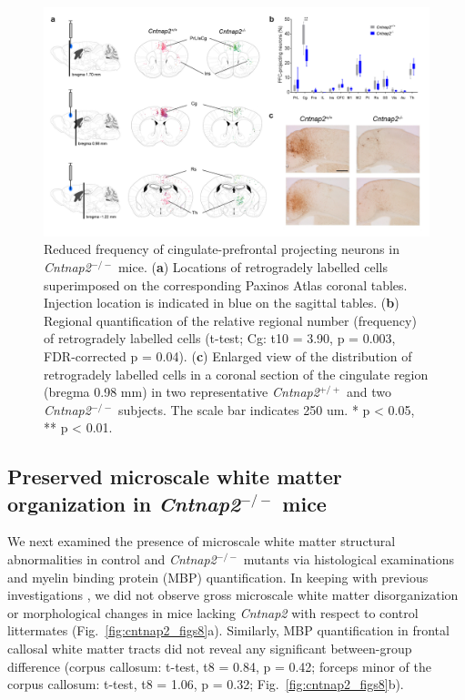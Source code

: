 \begin{figure}[th] 
    \centering
    \includegraphics[scale=0.4]{figures/cntnap2_figure_06.png}
    \decoRule
    \caption[Reduced frequency of cingulate-prefrontal projecting neurons in
    \textit{Cntnap2}$^{-/-}$ mice.]{Reduced frequency of cingulate-prefrontal projecting
    neurons in \textit{Cntnap2}$^{-/-}$ mice. (\textbf{a}) Locations of retrogradely labelled
    cells superimposed on the corresponding Paxinos Atlas coronal tables.
    Injection location is indicated in blue on the sagittal tables. (\textbf{b})
    Regional quantification of the relative regional number (frequency) of
    retrogradely labelled cells (t-test; Cg: t10 = 3.90, p = 0.003,
    FDR-corrected p = 0.04). (\textbf{c}) Enlarged view of the distribution of
    retrogradely labelled cells in a coronal section of the cingulate region
    (bregma 0.98 mm) in two representative \textit{Cntnap2}$^{+/+}$ and two \textit{Cntnap2}$^{-/-}$
    subjects. The scale bar indicates 250 um. * p < 0.05, ** p < 0.01.}
    \label{fig:cntnap2_fig06}
\end{figure}

\subsection{Preserved microscale white matter organization in \textit{Cntnap2}$^{-/-}$ mice}

We next examined the presence of microscale white matter structural
abnormalities in control and \textit{Cntnap2}$^{-/-}$ mutants via histological examinations
and myelin binding protein (MBP) quantification. In keeping with previous
investigations \parencite{poliak2003, penagarikano2011}, we did not observe
gross microscale white matter disorganization or morphological changes in mice
lacking \textit{Cntnap2} with respect to control littermates
(Fig.~\ref{fig:cntnap2_figs8}a). Similarly, MBP quantification in frontal
callosal white matter tracts did not reveal any significant between-group
difference (corpus callosum: t-test, t8 = 0.84, p = 0.42; forceps minor of the
corpus callosum: t-test, t8 = 1.06, p = 0.32; Fig.~\ref{fig:cntnap2_figs8}b).

